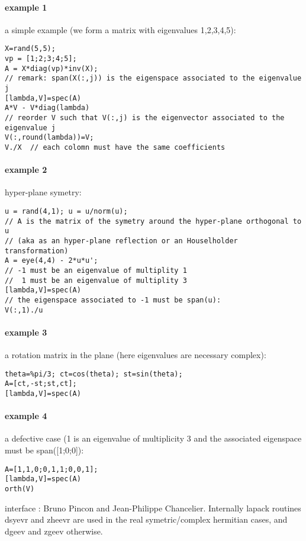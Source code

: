 \begin{examples}
\paragraph{example 1} a simple example (we form a matrix with eigenvalues 1,2,3,4,5):
\begin{Verbatim}
X=rand(5,5);
vp = [1;2;3;4;5];
A = X*diag(vp)*inv(X);
// remark: span(X(:,j)) is the eigenspace associated to the eigenvalue j
[lambda,V]=spec(A)
A*V - V*diag(lambda)
// reorder V such that V(:,j) is the eigenvector associated to the eigenvalue j
V(:,round(lambda))=V;
V./X  // each colomn must have the same coefficients
\end{Verbatim}

\paragraph{example 2} hyper-plane symetry:
\begin{Verbatim}
u = rand(4,1); u = u/norm(u);
// A is the matrix of the symetry around the hyper-plane orthogonal to u
// (aka as an hyper-plane reflection or an Houselholder transformation)
A = eye(4,4) - 2*u*u';
// -1 must be an eigenvalue of multiplity 1
//  1 must be an eigenvalue of multiplity 3
[lambda,V]=spec(A)
// the eigenspace associated to -1 must be span(u):
V(:,1)./u
\end{Verbatim}

\paragraph{example 3} a rotation matrix in the plane (here eigenvalues are necessary complex):
\begin{Verbatim}
theta=%pi/3; ct=cos(theta); st=sin(theta);
A=[ct,-st;st,ct];
[lambda,V]=spec(A)
\end{Verbatim}

\paragraph{example 4} a defective case (1 is an eigenvalue of multiplicity 3 
and the associated eigenspace must be span([1;0;0]):
\begin{Verbatim}
A=[1,1,0;0,1,1;0,0,1];
[lambda,V]=spec(A)
orth(V)
\end{Verbatim}
\end{examples}

\begin{manseealso}
\end{manseealso}

\begin{authors}
   interface : Bruno Pincon and Jean-Philippe Chancelier. Internally lapack routines dsyevr and
   zheevr are used in the real symetric/complex hermitian cases, 
   and dgeev and zgeev otherwise.
\end{authors}
